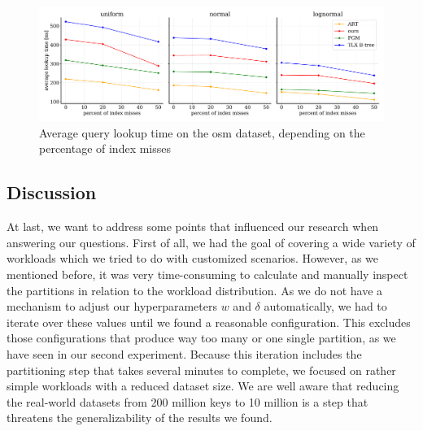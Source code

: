 \begin{figure}
    \centering
    \includegraphics[width=\textwidth]{figures/exp4_times.pdf}
    \caption[osm lookup performance after sampling with index misses]{Average query lookup time on the osm dataset, depending on the percentage of index misses}
    \label{fig:exp4times}
\end{figure}

\subsection{Discussion}
At last, we want to address some points that influenced our research when answering our questions. First of all, we had the goal of covering a wide variety of workloads which we tried to do with customized scenarios. However, as we mentioned before, it was very time-consuming to calculate and manually inspect the partitions in relation to the workload distribution. As we do not have a mechanism to adjust our hyperparameters $w$ and $\delta$ automatically, we had to iterate over these values until we found a reasonable configuration. This excludes those configurations that produce way too many or one single partition, as we have seen in our second experiment. Because this iteration includes the partitioning step that takes several minutes to complete, we focused on rather simple workloads with a reduced dataset size. We are well aware that reducing the real-world datasets from 200 million keys to 10 million is a step that threatens the generalizability of the results we found. 

